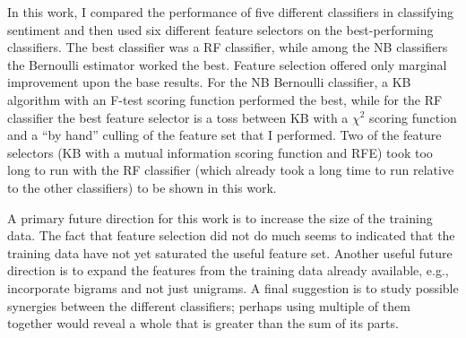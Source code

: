 In this work, I compared the performance of five different classifiers in classifying sentiment and then used six different feature selectors on the best-performing classifiers.  The best classifier was a RF classifier, while among the NB classifiers the Bernoulli estimator worked the best.  Feature selection offered only marginal improvement upon the base results.  For the NB Bernoulli classifier, a KB algorithm with an F-test scoring function performed the best, while for the RF classifier the best feature selector is a toss between KB with a $\chi^2$ scoring function and a ``by hand'' culling of the feature set that I performed.  Two of the feature selectors (KB with a mutual information scoring function and RFE) took too long to run with the RF classifier (which already took a long time to run relative to the other classifiers) to be shown in this work.

A primary future direction for this work is to increase the size of the training data.  The fact that feature selection did not do much seems to indicated that the training data have not yet saturated the useful feature set.  Another useful future direction is to expand the features from the training data already available, e.g., incorporate bigrams and not just unigrams.  A final suggestion is to study possible synergies between the different classifiers; perhaps using multiple of them together would reveal a whole that is greater than the sum of its parts.